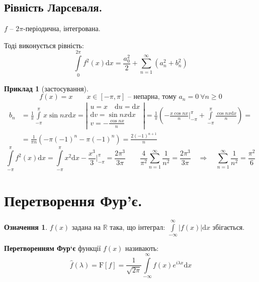 \documentclass[a4paper]{scrartcl}
\theoremstyle{definition}
\newtheorem*{defo}{Означення}
\newtheorem*{example}{Приклад}
\theoremstyle{remark}
\theoremstyle{definition}
\theoremstyle{definition}
\def\i{\infty}                 %
\begin{document}
\subsection{Рівність Ларсеваля.}
\begin{boxteo}
 \( f \) -- \(2\pi\)-періодична, інтегрована. \par
 Тоді виконується рівність:
 \[
    \int\limits_{0}^{2\pi}{
    f^2(x)\mathrm{d}x
    } = \frac{a_0^2}{2} +  \sum\limits_{n=1}^{\i}{
    \left( a_n^2 + b_n^2 \right)
    }
 \]
\end{boxteo}
\begin{example}[застосування]
  \[
   f (x) = x \qquad x\in[-\pi, \pi] \textit{ -- непарна, тому } a_n = 0 \  \forall n\geq 0
  \]
  \[
\begin{split}
b_n &= \frac{1}{\pi}  \int\limits_{-\pi}^{\pi}{
x \sin{nx} \mathrm{d} x
}  = \left| \begin{gathered}
 u = x \quad \mathrm{d}u  =\mathrm{d} x\\
 \mathrm{d} v = \sin{nx} \mathrm{d} x\\
 v = - \frac{\cos{nx}}{n}
\end{gathered} \right| =  \frac{1}{\pi} \left(
- \frac{x \cos{nx}}{n} \bigg|_{-\pi}^\pi  +  \int\limits_{-\pi}^{\pi}{
\frac{\cos{nx}\mathrm{d} x}{n}
}
 \right) =\\
&= \frac{1}{\pi n} \left( - \pi (-1)^n - \pi(-1)^n \right) = \frac{2 (-1)^{n+1}}{ n}
\end{split}
  \]
  \[
    \int\limits_{-\pi}^{\pi}{
    f^2(x) \mathrm{d} x
    } =  \int\limits_{-\pi}^{\pi}{
    x^2 \mathrm{d} x
    } - \frac{x^3}{3} \bigg|_{-\pi}^{\pi}  = \frac{2 \pi^3}{3 \pi}
\qquad
   \frac{4}{\pi^2}  \sum\limits_{n=1}^{\i}{
   \frac{1}{n^2} = \frac{2 \pi^3}{3 \pi} \quad  \Longrightarrow \quad \sum\limits_{n=1}^{\i}{
   \frac{1}{n^2} = \frac{\pi^2}{6}
   }
   }
  \]
\end{example}
\newpage
\section{Перетворення Фур'є.}
\begin{defo} \( f(x) \) задана на \( \mathbb{R} \) така, що інтеграл: \( \displaystyle
\int\limits_{-\i}^{\i}{
\left| f(x) \right| \mathrm{d} x
} \) збігається.\par
\textbf{Перетворенням Фур`є} функції \( f(x) \) називають:
\[
 \widehat{f}(\lambda) = \mathrm{F}[f] =  \frac{1}{\sqrt{2\pi}}   \int\limits_{-\i}^{\i}{
 f(x) e^{i \lambda x} \mathrm{d} x
 }
\]
\end{defo}
\end{document}
